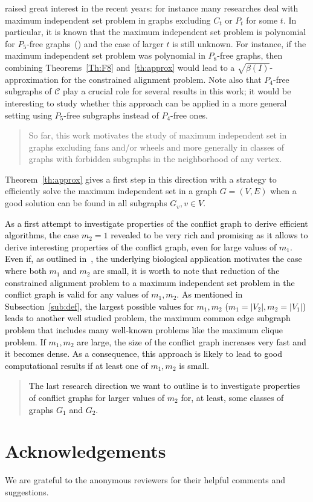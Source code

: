 \documentclass[final]{dmtcs-episciences}
\newcommand\mar[1]{\textcolor{black}{#1}}
\begin{document}
raised great interest in the recent years: for instance many researches deal with maximum independent set problem in graphs excluding $C_t$ or $P_t$ for some $t$. In particular, it is known that the maximum independent set  problem is  polynomial for $P_5$-free graphs~(\citet{ISP5}) and the case of larger $t$ is still unknown. For instance, if the maximum independent set problem was polynomial in $P_8$-free graphs, then combining Theorems~\ref{Th:F8} and~\ref{th:approx} would lead to a $\sqrt{\beta(I)}$-approximation for the constrained alignment problem. Note also that $P_4$-free subgraphs of $\mathcal{C}$ play a crucial role for several results in this work; it would be interesting to study whether this approach can be applied in a more general setting using $P_5$-free subgraphs instead of $P_4$-free ones. 
\begin{quote}
So far, this work motivates the study of maximum independent set in graphs excluding fans and/or wheels
and more generally in classes of graphs with forbidden subgraphs in the neighborhood of any vertex.
\end{quote}
Theorem~\ref{th:approx} gives a first step in this direction with a strategy to efficiently solve the maximum independent set in a graph $G=(V,E)$ when a good solution can be found in all subgraphs $G_v, v\in V$. 

\mar{As a first attempt to investigate properties of the conflict graph to derive efficient algorithms, the case $m_2=1$ revealed to be very rich and promising as it allows to derive interesting properties of the conflict graph, even for large values of $m_1$. Even if, as outlined in~\cite{Fagnot2008}, the underlying biological application motivates the case where both $m_1$ and $m_2$ are small, it is worth to note that reduction of the constrained alignment problem to a maximum independent set problem in the conflict graph is valid for any values of $m_1, m_2$.   As mentioned in Subsection~\ref{sub:def}, the largest possible values for $m_1, m_2$ ($m_1=|V_2|, m_2=|V_1|$)  leads to   another well studied problem, the maximum common edge subgraph problem that includes many well-known problems like the maximum clique problem. If $m_1, m_2$ are large, the size of the conflict graph increases very fast and it becomes dense. As a consequence,  this approach is likely to lead to good computational results if at least one of $m_1, m_2$ is small.} 

\begin{quote}
    \mar{The last research direction we want to outline is to investigate properties of conflict graphs for larger values of $m_2$ for, at least, some classes of graphs $G_1$ and $G_2$.}
\end{quote}

\section*{Acknowledgements}
We are grateful to the anonymous reviewers for their helpful comments and suggestions.


	   
\end{document}
